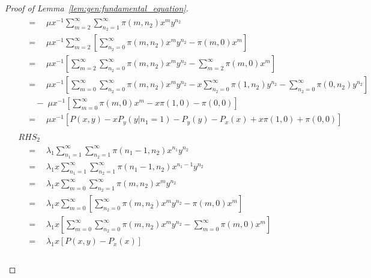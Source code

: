 \begin{proof}[Proof of Lemma~\ref{lem:gen:fundamental_equation}]
\begin{align*}
\begin{split}
            & \quad = \quad \mu x^{-1} \sum_{m=2}^{\infty} \sum_{n_2=1}^{\infty} \pi(m, n_2) x^{m} y^{n_2} \\
            & \quad = \quad \mu x^{-1} \sum_{m=2}^{\infty} \left[
                \sum_{n_2=0}^{\infty} \pi(m, n_2) x^{m} y^{n_2} - \pi(m, 0) x^m
            \right] \\
            & \quad = \quad \mu x^{-1} \left[ \sum_{m=2}^{\infty} \sum_{n_2=0}^{\infty} \pi(m, n_2) x^{m} y^{n_2}
                - \sum_{m=2}^{\infty} \pi(m, 0) x^{m}
            \right] \\
            & \quad = \quad \mu x^{-1} \left[
                \sum_{m=0}^{\infty} \sum_{n_2=0}^{\infty} \pi(m, n_2) x^{m} y^{n_2}
                - x \sum_{n_2=0}^{\infty} \pi(1, n_2) y^{n_2}
                - \sum_{n_2=0}^{\infty} \pi(0, n_2) y^{n_2}
            \right] \\
            & \quad \quad - \; \mu x^{-1} \left[
                \sum_{m=0}^{\infty} \pi(m, 0) x^{m} - x \pi(1, 0) - \pi(0, 0)
            \right] \\
            & \quad = \quad \mu x^{-1} \left[
                P(x,y) - x P_y(y | n_1=1) - P_y(y) - P_x(x) + x \pi(1, 0) + \pi(0, 0)
            \right]
        \end{split} \\
        \begin{split}
            & RHS_2 \\
            & \quad = \quad \lambda_1 \sum_{n_1=1}^{\infty} \sum_{n_2=1}^{\infty} \pi(n_1-1, n_2) x^{n_1} y^{n_2} \\
            & \quad = \quad \lambda_1 x \sum_{n_1=1}^{\infty} \sum_{n_2=1}^{\infty} \pi(n_1-1, n_2) x^{n_1-1} y^{n_2} \\
            & \quad = \quad \lambda_1 x \sum_{m=0}^{\infty} \sum_{n_2=1}^{\infty} \pi(m, n_2) x^{m} y^{n_2} \\
            & \quad = \quad \lambda_1 x \sum_{m=0}^{\infty} \left[
                \sum_{n_2=0}^{\infty} \pi(m, n_2) x^{m} y^{n_2} - \pi(m, 0) x^m
            \right] \\
            & \quad = \quad \lambda_1 x \left[
                \sum_{m=0}^{\infty} \sum_{n_2=0}^{\infty} \pi(m, n_2) x^{m} y^{n_2}
                - \sum_{m=0}^{\infty} \pi(m, 0) x^m
            \right] \\
            & \quad = \quad \lambda_1 x \left[ P(x,y) - P_x(x) \right]
        \end{split} \\
        \begin{split}

\end{split}
\end{align*}
\end{proof}
